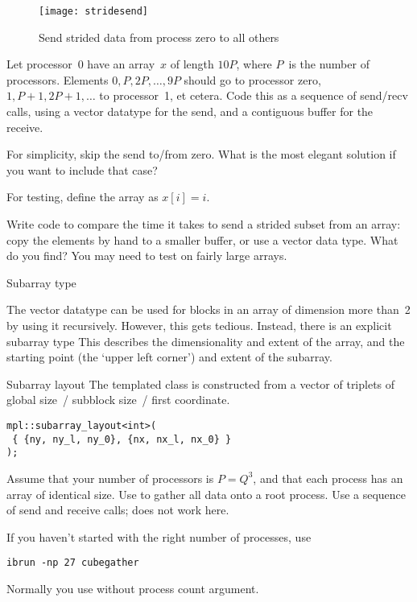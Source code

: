 \begin{figure}[t]
  \texttt{[image: stridesend]}
  \caption{Send strided data from process zero to all others}
  \label{fig:stridesend}
\end{figure}

\begin{exercise}
  \label{ex:stridesend}
  Let processor~0 have an array~$x$ of length $10P$, where $P$~is the number of processors.
  Elements $0,P,2P,\ldots,9P$ should go to processor zero, $1,P+1,2P+1,\ldots$ to processor~1,
  et cetera. Code this as a sequence of send/recv calls, using a vector datatype
  for the send, and a contiguous buffer for the receive.

  For simplicity, skip the send to/from zero. What is the most elegant
  solution if you want to include that case?

  For testing, define the array as $x[i]=i$.
\end{exercise}

\begin{exercise}
  Write code to compare the time it takes to send a strided subset
  from an array: copy the elements by hand to a smaller buffer, or use
  a vector data type. What do you find? You may need to test on fairly
  large arrays.
\end{exercise}

 {Subarray type}
\label{sec:type_subarray}

The vector datatype can be used for blocks in an array of dimension
more than~2 by using it recursively. However, this gets
tedious. Instead, there is an explicit subarray type
%
%
This describes the dimensionality and extent of the array, and
the starting point (the `upper left corner') and extent of the
subarray.

\begin{mplnote}{Subarray layout}
  The templated  class is constructed
  from a vector of triplets of global size~/ subblock size~/ first coordinate.
\begin{lstlisting}
mpl::subarray_layout<int>( 
 { {ny, ny_l, ny_0}, {nx, nx_l, nx_0} }
);  
\end{lstlisting}
\end{mplnote}

\begin{exercise}
  \label{ex:cubegather}

  Assume that your number of processors is $P=Q^3$, and that each
  process has an array of identical size. Use
   to gather all data onto a root process.
  Use a sequence of send and receive calls;
   does not work here.

\begin{tacc}
If you haven't started  with the right number of processes,
use
\begin{verbatim}
ibrun -np 27 cubegather
\end{verbatim}
Normally you use  without process count argument.
\end{tacc}

\end{exercise}

